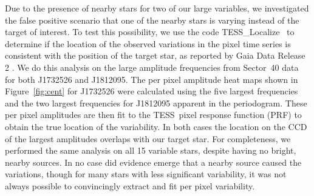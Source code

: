 \documentclass[twocolumn]{aastex631}
\newcommand{\tess}{TESS}
\newcommand{\tesslocalize}{{{\fontfamily{lmtt}\selectfont TESS\_Localize}}}
\begin{document}

Due to the presence of nearby stars for two of our large variables, we investigated the false positive scenario that one of the nearby stars is varying instead of the target of interest. To test this possibility, we use the code \tesslocalize\ \citep{HiggensBell} to determine if the location of the observed variations in the pixel time series is consistent with the position of the target star, as reported by Gaia Data Release 2 \citep{gaiaDR22018}.  We do this analysis on the large amplitude frequencies from Sector~40 data for both J1732526 and J1812095. The per pixel amplitude heat maps shown in Figure~\ref{fig:cent} for J1732526 were calculated using the five largest frequencies and the two largest frequencies for J1812095 apparent in the periodogram.  These per pixel amplitudes are then fit to the \tess\ pixel response function (PRF) to obtain the true location of the variability. In both cases the location on the CCD of the largest amplitudes overlaps with our target star.  For completeness, we performed the same analysis on all 15 variable stars, despite having no bright, nearby sources. In no case did evidence emerge that a nearby source caused the variations, though for many stars with less significant variability, it was not always possible to convincingly extract and fit per pixel variability.



\vspace{-1em}
\end{document}
